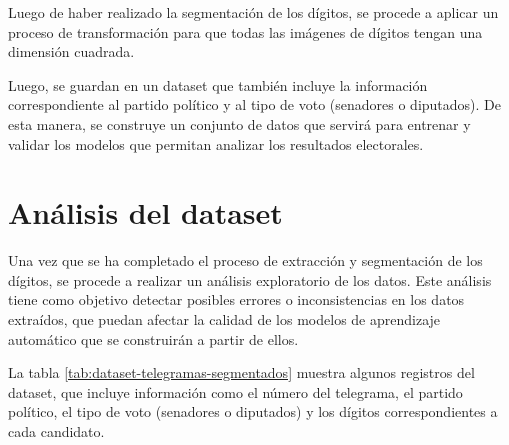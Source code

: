 Luego de haber realizado la segmentación de los dígitos, se procede a aplicar un proceso de transformación para que
todas las imágenes de dígitos tengan una dimensión cuadrada.

Luego, se guardan en un dataset que también incluye la información correspondiente al partido político y al tipo de
voto (senadores o diputados). De esta manera, se construye un conjunto de datos que servirá para entrenar y validar los
modelos que permitan analizar los resultados electorales.

\section{Análisis del dataset}

Una vez que se ha completado el proceso de extracción y segmentación de los dígitos, se procede a realizar un análisis
exploratorio de los datos. Este análisis tiene como objetivo detectar posibles errores o inconsistencias en los datos
extraídos, que puedan afectar la calidad de los modelos de aprendizaje automático que se construirán a partir de ellos.

La tabla \ref{tab:dataset-telegramas-segmentados} muestra algunos registros del dataset, que incluye información como
el número del telegrama, el partido político, el tipo de voto (senadores o diputados) y los dígitos correspondientes a
cada candidato.

